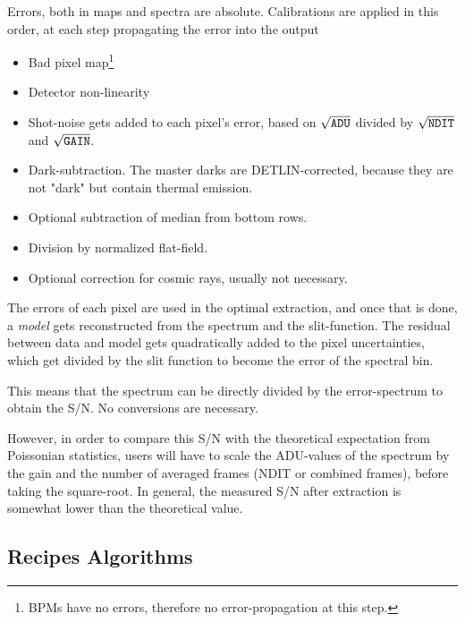 Errors, both in maps and spectra are absolute. Calibrations are applied in this
order, at each step propagating the error into the output
\begin{itemize}
    \item Bad pixel map\footnote{BPMs have no errors, therefore no error-propagation at this step.}
    \item Detector non-linearity
    \item Shot-noise gets added to each pixel's error, based on $\sqrt{\verb!ADU!}$
    divided by $\sqrt{\verb!NDIT!}$ and $\sqrt{\verb!GAIN!}$.
    \item Dark-subtraction. The master darks are DETLIN-corrected, because they are not "dark" but contain thermal emission.
    \item Optional subtraction of median from bottom rows.
    \item Division by normalized flat-field.
    \item Optional correction for cosmic rays, usually not necessary.
\end{itemize}


The errors of each pixel are used in the optimal extraction, and once that is
done, a \emph{model} gets reconstructed from the spectrum and the slit-function.
The residual between data and model gets quadratically added to the pixel
uncertainties, which get divided by the slit function to become the error of the
spectral bin.

This means that the spectrum can be directly divided by the error-spectrum to
obtain the S/N. No conversions are necessary.

However, in order to compare this S/N with the theoretical expectation from
Poissonian statistics, users will have to scale the ADU-values of the spectrum
by the gain and the number of averaged frames (NDIT or combined frames), before
taking the square-root. In general, the measured S/N after extraction is
somewhat lower than the theoretical value.


\subsection{Recipes Algorithms} 
\label{sec:algorithms-recipes}


